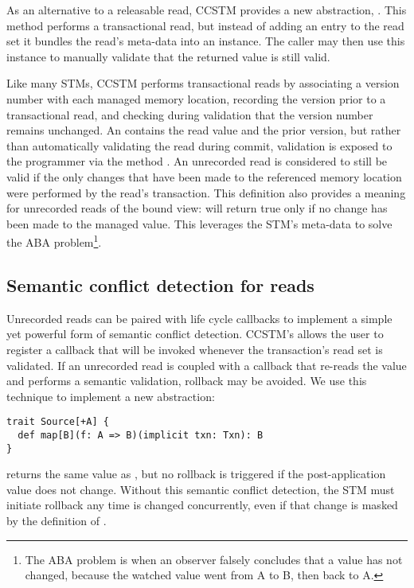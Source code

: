 As an alternative to a releasable read, CCSTM provides a new
abstraction, .  This method performs a
transactional read, but instead of adding an entry to the read set it
bundles the read's meta-data into an  instance.
The caller may then use this instance to manually validate that the
returned value is still valid.

Like many STMs, CCSTM performs transactional reads by associating a
version number with each managed memory location, recording the version
prior to a transactional read, and checking during validation that the
version number remains unchanged.  An  contains the
read value and the prior version, but rather than automatically validating
the read during commit, validation is exposed to the programmer via the
method .  An unrecorded read is considered to still be
valid if the only changes that have been made to the referenced memory
location were performed by the read's transaction.  This definition also
provides a meaning for unrecorded reads of the  bound view:
 will return true only if no change has been made to the
managed value.  This leverages the STM's meta-data to solve
the ABA problem\footnote{The ABA problem is when an observer falsely
concludes that a value has not changed, because the watched value went
from A to B, then back to A.}.

\subsection{Semantic conflict detection for reads}
\label{sec:map}

Unrecorded reads can be paired with life cycle callbacks to implement a
simple yet powerful form of semantic
conflict detection.  CCSTM's  allows the user to register a callback
that will be invoked whenever the transaction's read set is validated.  If
an unrecorded read is coupled with a callback that re-reads the value and
performs a semantic validation, rollback may be avoided.
We use this technique to
implement a new abstraction:
\lstset{numbers=none}
\begin{lstlisting}
trait Source[+A] {
  def map[B](f: A => B)(implicit txn: Txn): B
}
\end{lstlisting}
\lstset{numbers=left}
 returns the same value as , but no rollback
is triggered if the post-application value does not change.  Without this
semantic conflict detection, the STM must initiate rollback any time 
is changed concurrently, even if that change is masked by the definition of
.

